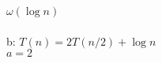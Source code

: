\documentclass{article}
\begin{document}
                                                                                                                                                                                                                                                                                                                                                                                                                                                                                                                                                                                                                                                                                                        $\omega(\log{n})$\\
                                                                                                                                                                                                                                                                                                                                                                                                                                                                                                                                                                                                                                                                                                                \\
                                                                                                                                                                                                                                                                                                                                                                                                                                                                                                                                                                                                                                                                                                                        b: $T(n) = 2T(n/2) + \log{n}$\\
                                                                                                                                                                                                                                                                                                                                                                                                                                                                                                                                                                                                                                                                                                                                $a=2$\\
\end{document}
